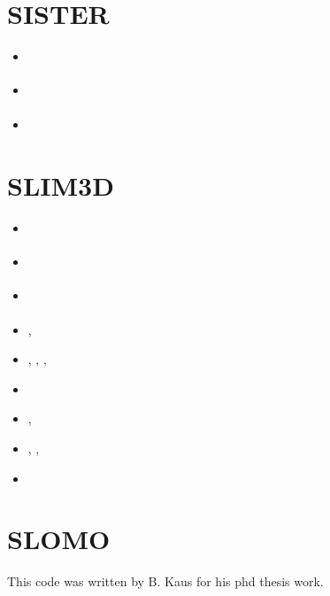 \section{SISTER}

\begin{small}
\begin{itemize}
\item[\twothousandsixteen]   \textcite{olbm16} 
\item[\twothousandeighteen]  \textcite{weib18}
\item[\twothousandtwentyone] \textcite{haao21}
\end{itemize}
\end{small}

\section{SLIM3D} 

\begin{small}
\begin{itemize}
\item[\twothousandeight]     \textcite{poso08}
\item[\twothousandten]       \textcite{qusp10}
\item[\twothousandtwelve]    \textcite{brps12}
\item[\twothousandthirteen]  \textcite{brps13},  \textcite{brau13}
\item[\twothousandfourteen]  \textcite{brun14},  \textcite{hebr14},  \textcite{kobf14},
                             \textcite{brhp14}
\item[\twothousandfifteen]   \textcite{clbq15}
\item[\twothousandseventeen] \textcite{brcr17},  \textcite{baso17} 
\item[\twothousandeighteen]  \textcite{basq18},  \textcite{osss18},  \textcite{osss18b}
\item[\twothousandnineteen]  \textcite{sobr19}
\end{itemize}
\end{small}


\section{SLOMO} 
This code was written by B. Kaus for his phd thesis work.

